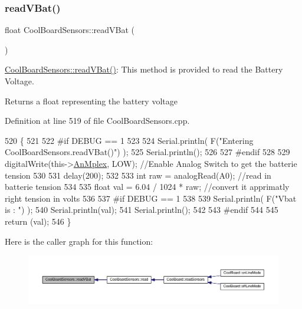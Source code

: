 \subsubsection{\texorpdfstring{read\+V\+Bat()}{readVBat()}}
{\footnotesize\ttfamily float Cool\+Board\+Sensors\+::read\+V\+Bat (\begin{DoxyParamCaption}{ }\end{DoxyParamCaption})}

\hyperlink{class_cool_board_sensors_a6944b6ea7bce8e2fce1b434acfd9d5f3}{Cool\+Board\+Sensors\+::read\+V\+Bat()}\+: This method is provided to read the Battery Voltage.

\begin{DoxyReturn}{Returns}
a float representing the battery voltage 
\end{DoxyReturn}


Definition at line 519 of file Cool\+Board\+Sensors.\+cpp.


\begin{DoxyCode}
520 \{
521 
522 \textcolor{preprocessor}{#if DEBUG == 1}
523 
524     Serial.println( F(\textcolor{stringliteral}{"Entering CoolBoardSensors.readVBat()"}) );
525     Serial.println();
526 
527 \textcolor{preprocessor}{#endif}
528 
529     digitalWrite(this->\hyperlink{class_cool_board_sensors_a12ef28b1046219e0aee10bf64e28c4a5}{AnMplex}, LOW);                            \textcolor{comment}{//Enable Analog Switch to get the
       batterie tension}
530     
531     delay(200);
532     
533     \textcolor{keywordtype}{int} raw = analogRead(A0);                                    \textcolor{comment}{//read in batterie tension}
534     
535     \textcolor{keywordtype}{float} val = 6.04 / 1024 * raw;                               \textcolor{comment}{//convert it apprimatly right tension in
       volts}
536     
537 \textcolor{preprocessor}{#if DEBUG == 1}
538 
539     Serial.println( F(\textcolor{stringliteral}{"Vbat is : "}) );
540     Serial.println(val);
541     Serial.println();
542 
543 \textcolor{preprocessor}{#endif}
544 
545     \textcolor{keywordflow}{return} (val);   
546 \}
\end{DoxyCode}
Here is the caller graph for this function\+:\nopagebreak
\begin{figure}[H]
\begin{center}
\leavevmode
\includegraphics[width=350pt]{de/d46/class_cool_board_sensors_a6944b6ea7bce8e2fce1b434acfd9d5f3_icgraph}
\end{center}
\end{figure}
\mbox{\label{class_cool_board_sensors_a406307ffd70272282d91479c7ed8d66f}} 
